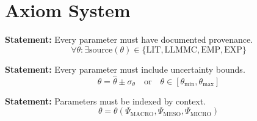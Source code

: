 \section{Axiom System}
\label{sec:where-axioms}

\begin{tcolorbox}[colback=gray!5!white, colframe=gray!75!black,
    title=Axiom UNMAPPED_PAR-1: Provenance Requirement]
\textbf{Statement:} Every parameter must have documented provenance.
\begin{equation}
\forall \theta: \exists \text{source}(\theta) \in \{\text{LIT}, \text{LLMMC}, \text{EMP}, \text{EXP}\}
\end{equation}
\end{tcolorbox}

\begin{tcolorbox}[colback=gray!5!white, colframe=gray!75!black,
    title=Axiom UNMAPPED_PAR-2: Uncertainty Quantification]
\textbf{Statement:} Every parameter must include uncertainty bounds.
\begin{equation}
\theta = \hat{\theta} \pm \sigma_{\theta} \quad \text{or} \quad \theta \in [\theta_{\min}, \theta_{\max}]
\end{equation}
\end{tcolorbox}

\begin{tcolorbox}[colback=gray!5!white, colframe=gray!75!black,
    title=Axiom UNMAPPED_PAR-3: Context Indexing]
\textbf{Statement:} Parameters must be indexed by context.
\begin{equation}
\theta = \theta(\Psi_{\text{MACRO}}, \Psi_{\text{MESO}}, \Psi_{\text{MICRO}})
\end{equation}
\end{tcolorbox}

